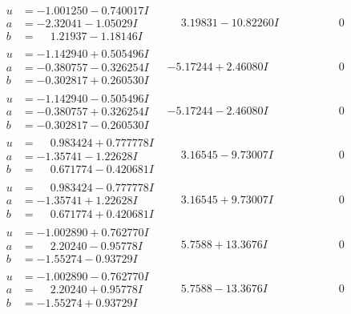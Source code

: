 \documentclass[1p]{elsarticle_modified}
\theoremstyle{definition}
\begin{document}
$$\begin{array}{c|c|c}
\begin{aligned}
u &= -1.001250 - 0.740017 I \\
a &= -2.32041 - 1.05029 I \\
b &= \phantom{-}1.21937 - 1.18146 I\end{aligned}
 & \phantom{-}3.19831 - 10.82260 I & \phantom{-0.000000 } 0 \\ \hline\begin{aligned}
u &= -1.142940 + 0.505496 I \\
a &= -0.380757 - 0.326254 I \\
b &= -0.302817 + 0.260530 I\end{aligned}
 & -5.17244 + 2.46080 I & \phantom{-0.000000 } 0 \\ \hline\begin{aligned}
u &= -1.142940 - 0.505496 I \\
a &= -0.380757 + 0.326254 I \\
b &= -0.302817 - 0.260530 I\end{aligned}
 & -5.17244 - 2.46080 I & \phantom{-0.000000 } 0 \\ \hline\begin{aligned}
u &= \phantom{-}0.983424 + 0.777778 I \\
a &= -1.35741 - 1.22628 I \\
b &= \phantom{-}0.671774 - 0.420681 I\end{aligned}
 & \phantom{-}3.16545 - 9.73007 I & \phantom{-0.000000 } 0 \\ \hline\begin{aligned}
u &= \phantom{-}0.983424 - 0.777778 I \\
a &= -1.35741 + 1.22628 I \\
b &= \phantom{-}0.671774 + 0.420681 I\end{aligned}
 & \phantom{-}3.16545 + 9.73007 I & \phantom{-0.000000 } 0 \\ \hline\begin{aligned}
u &= -1.002890 + 0.762770 I \\
a &= \phantom{-}2.20240 - 0.95778 I \\
b &= -1.55274 - 0.93729 I\end{aligned}
 & \phantom{-}5.7588 + 13.3676 I & \phantom{-0.000000 } 0 \\ \hline\begin{aligned}
u &= -1.002890 - 0.762770 I \\
a &= \phantom{-}2.20240 + 0.95778 I \\
b &= -1.55274 + 0.93729 I\end{aligned}
 & \phantom{-}5.7588 - 13.3676 I & \phantom{-0.000000 } 0 \\ \hline\begin{aligned}

\end{aligned}
\end{array}$$
\end{document}
